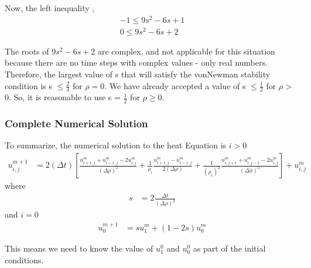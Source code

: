 \documentclass[11pt]{article}
\makeatletter
\def\gt{>}
\newcommand{\boxspacing}{\kern\kvtcb@left@rule\kern\kvtcb@boxsep}
\newcommand{\prompt}[4]{
        {\ttfamily\llap{{\color{#2}[#3]:\hspace{3pt}#4}}\vspace{-\baselineskip}}
    }
\makeatother
\begin{document}
Now, the left inequality , \begin{equation}
\begin{split}
-1 \leq 9s^2 - 6s + 1  \\
0 \leq 9s^2 - 6s + 2 
\end{split}
\end{equation}

The roots of \(9s^2 - 6s + 2\) are complex, and not applicable for this
situation because there are no time steps with complex values - only
real numbers. Therefore, the largest value of s that will satisfy the
vonNewman stability condition is s \(\leq \frac{2}{3}\) for
\(\rho = 0\). We have already accepted a value of s \(\leq \frac{1}{2}\)
for \(\rho \gt\) 0. So, it is reasonable to use s = \(\frac{1}{2}\) for
\(\rho \geq 0\).

    \hypertarget{complete-numerical-solution}{%
\subsubsection{Complete Numerical
Solution}\label{complete-numerical-solution}}

    To summarize, the numerical solution to the heat Equation is \(i \gt 0\)
\begin{equation}
\begin{split}
u_{i,j}^{m + 1} &= 2 (\Delta t) \left[\frac{u_{i + 1 ,j}^m + u_{i - 1 ,j}^m - 2 u_{i,j}^m}{(\Delta \rho)^2} + 
\frac{1}{\rho_i} \frac{u_{i + 1,j}^{m} - u_{i -1 ,j}^{m}}{2 (\Delta \rho)} +
\frac{1}{(\rho_i)^2} \frac{u_{i,j + 1}^m + u_{i,j - 1}^m - 2 u_{i,j}^m}{(\Delta \phi)^2} \right] +  u_{i,j}^{m} 
\end{split}
\end{equation} where \begin{equation}
\begin{split}
s &= 2 \frac{\Delta t}{(\Delta \rho)^2}
\end{split}
\end{equation} and \(i = 0\) \begin{equation}
\begin{split}
u_{0}^{m + 1} &= s u_{1}^m + (1 - 2s) u_{0}^m 
\end{split}
\end{equation}

This means we need to know the value of \(u_{1}^0\) and \(u_{0}^0\) as
part of the initial conditions.

    \begin{tcolorbox}[breakable, size=fbox, boxrule=1pt, pad at break*=1mm,colback=cellbackground, colframe=cellborder]
\prompt{In}{incolor}{ }{\boxspacing}
\begin{Verbatim}[commandchars=\\\{\}]

\end{Verbatim}
\end{tcolorbox}
\end{document}
